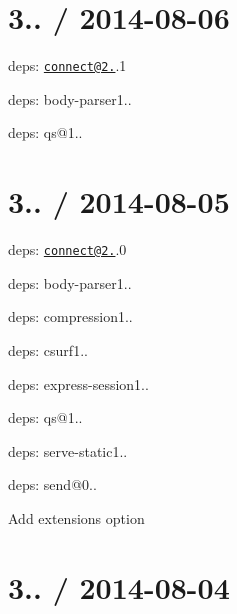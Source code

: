 {\ttfamily \section*{3.. / 2014-\/08-\/06 }}

{\ttfamily }

{\ttfamily 
\begin{DoxyItemize}
\item deps\+: \href{mailto:connect@2.25}{\tt connect@2.}.1
\begin{DoxyItemize}
\item deps\+: body-\/parser1..
\item deps\+: qs@1..
\end{DoxyItemize}
\end{DoxyItemize}}

{\ttfamily \section*{3.. / 2014-\/08-\/05 }}

{\ttfamily }

{\ttfamily 
\begin{DoxyItemize}
\item deps\+: \href{mailto:connect@2.25}{\tt connect@2.}.0
\begin{DoxyItemize}
\item deps\+: body-\/parser1..
\item deps\+: compression1..
\item deps\+: csurf1..
\item deps\+: express-\/session1..
\item deps\+: qs@1..
\item deps\+: serve-\/static1..
\end{DoxyItemize}
\item deps\+: send@0..
\begin{DoxyItemize}
\item Add {\ttfamily extensions} option
\end{DoxyItemize}
\end{DoxyItemize}}

{\ttfamily \section*{3.. / 2014-\/08-\/04 }}

{\ttfamily }

